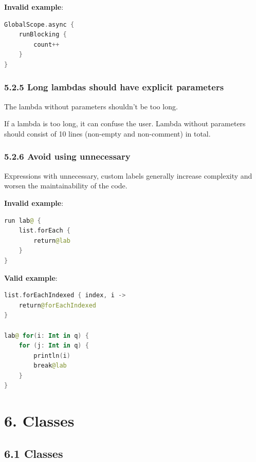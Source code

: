 \textbf{Invalid example}:

\begin{lstlisting}[language=Kotlin]
GlobalScope.async {
    runBlocking {
        count++
    }   
}
\end{lstlisting}
\subsubsection*{\textbf{5.2.5 Long lambdas should have explicit parameters}}
\leavevmode\newline

\label{sec:5.2.5}

The lambda without parameters shouldn't be too long.

If a lambda is too long, it can confuse the user. Lambda without parameters should consist of 10 lines (non-empty and non-comment) in total.



\subsubsection*{\textbf{5.2.6 Avoid using unnecessary}}
\leavevmode\newline

\label{sec:5.2.6}

Expressions with unnecessary, custom labels generally increase complexity and worsen the maintainability of the code.



\textbf{Invalid example}:

\begin{lstlisting}[language=Kotlin]
run lab@ {
    list.forEach {
        return@lab
    }
}
\end{lstlisting}


\textbf{Valid example}:

\begin{lstlisting}[language=Kotlin]
list.forEachIndexed { index, i ->
    return@forEachIndexed
}

lab@ for(i: Int in q) {
    for (j: Int in q) {
        println(i)
        break@lab
    }
}
\end{lstlisting}
\section*{\textbf{6. Classes}}

\label{sec:6.}

\subsection*{\textbf{6.1 Classes}}

